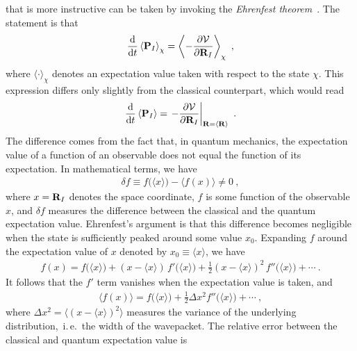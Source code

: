  that is more instructive can be taken by invoking the \emph{Ehrenfest theorem}~\cite{Ehrenfest1927,Basdevant2007}. The statement is that
\begin{align}
\frac{\d}{\d t} \left\langle {\bf P}_I \right\rangle_{\chi}
= \left\langle
- \frac{\partial \mathcal{V}}{\partial {\bf R}_I}
\right\rangle_{\chi}~,
\label{eq:ehrenfest.de1}
\end{align}
where $\langle \cdot \rangle_{\chi}$ denotes an expectation value taken with respect to the state $\chi$. This expression differs only slightly from the classical counterpart, which would read
\begin{align}
\frac{\d}{\d t} \left\langle {\bf P}_I \right\rangle
= \left.
- \frac{\partial \mathcal{V}}{\partial {\bf R}_I}
\right\vert_{{\bf R} = \langle {\bf R} \rangle}~.
\label{eq:ehrenfest.de2}
\end{align}
The difference comes from the fact that, in quantum mechanics, the expectation value of a function of an observable does not equal the function of its expectation. In mathematical terms, we have
\begin{align}
\delta f  \equiv 
f \bm ( \langle x \rangle \bm{)} 
- 
\bm{\langle} f (x) \bm{\rangle}
\neq 0
~,
\label{eq:ehrenfest.delta1}
\end{align}
where $x = {\bf R}_I$ denotes the space coordinate, %
$f$ is some function of the observable   $x$, and $\delta f$ measures the difference between the classical and the quantum expectation value. Ehrenfest's argument is that this difference becomes negligible when the state is sufficiently peaked around some value $x_0$. Expanding $f$ around the expectation value of $x$ denoted by $x_0 \equiv \langle x \rangle$, we have
\begin{align}
f(x) = f \bm ( \langle x \rangle \bm{)}  
+ (x - \langle x \rangle) \, f' \bm ( \langle x \rangle \bm{)}
+ \frac{1}{2} (x - \langle x \rangle)^2 \, f'' \bm ( \langle x \rangle \bm{)}
+ \cdots~.
\label{eq:ehrenfest.f2}
\end{align}
It follows that the $f'$ term vanishes when the expectation value is taken, and
\begin{align}
\langle f(x) \rangle 
= f \bm ( \langle x \rangle \bm{)}  
+ \frac{1}{2} \Delta x^2 f'' \bm ( \langle x \rangle \bm{)}
+ \cdots~,
\label{eq:ehrenfest.f3}
\end{align}
where $\Delta x^2 = \bm{\langle} (x - \langle x \rangle)^2 \bm{\rangle}$ measures the variance of the underlying distribution,~i.\,e.~the width of the wavepacket. The relative error between the classical and quantum expectation value is %
